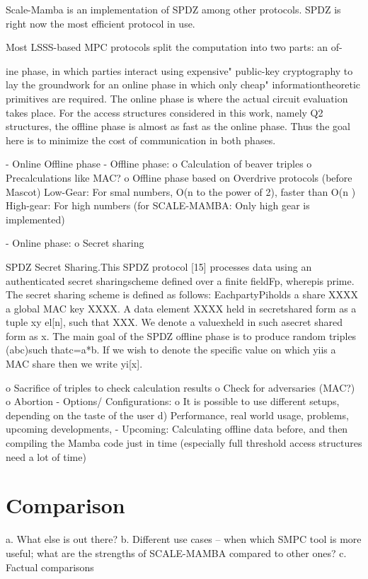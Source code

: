 \documentclass[english,runningheads,a4paper]{llncs}[2018/03/10]
\begin{document}
Scale-Mamba is an implementation of SPDZ among other protocols. SPDZ is right now the most efficient protocol in use. 

Most LSSS-based MPC protocols split the computation into two parts: an of-

ine phase, in which parties interact using expensive" public-key cryptography
to lay the groundwork for an online phase in which only cheap" informationtheoretic
primitives are required. The online phase is where the actual circuit
evaluation takes place. For the access structures considered in this work, namely
Q2 structures, the offline phase is almost as fast as the online phase. Thus the
goal here is to minimize the cost of communication in both phases.

-	Online  Offline phase
-	Offline phase:
o	Calculation of beaver triples
o	Precalculations like MAC?
o 	Offline phase based on Overdrive protocols (before Mascot)
		Low-Gear: For smal numbers, O(n to the power of 2), faster than O(n )
		High-gear: For high numbers (for SCALE-MAMBA: Only high gear is implemented)

-	Online phase:
o	Secret sharing

SPDZ  Secret  Sharing.This  SPDZ  protocol  [15]  processes  data  using  an  authenticated  secret  sharingscheme defined over a finite fieldFp, wherepis prime. The secret sharing scheme is defined as follows: EachpartyPiholds a share XXXX a global MAC key XXXX. A data element XXXX held in secretshared form as a tuple  xy el[n], such that XXX. We denote a valuexheld in such asecret shared form as x. The main goal of the SPDZ offline phase is to produce random triples (abc)such thatc=a*b. If we wish to denote the specific value on which yiis a MAC share then we write yi[x].

o	Sacrifice of triples to check calculation results
o	Check for adversaries (MAC?)
o	Abortion
-	Options/ Configurations:
o	It is possible to use different setups, depending on the taste of the user
d)	Performance, real world usage, problems, upcoming developments, 
-	Upcoming: Calculating offline data before, and then compiling the Mamba code just in time (especially full threshold access structures need a lot of time)




\section{Comparison}\label{sec:comparison}


a.	What else is out there?
b.	Different use cases – when which SMPC tool is more useful; what are the strengths of SCALE-MAMBA compared to other ones?
c.	Factual comparisons
\end{document}
